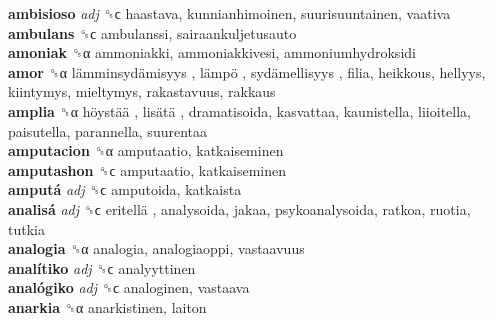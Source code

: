 \textbf{ambisioso} \emph{adj}  ␝ϲ  haastava, kunnianhimoinen, suurisuuntainen, vaativa  \\
\textbf{ambulans} ␝ϲ  ambulanssi, sairaankuljetusauto  \\
\textbf{amoniak} ␝α  ammoniakki, ammoniakkivesi, ammoniumhydroksidi  \\
\textbf{amor} ␝α   lämminsydämisyys ,  lämpö ,  sydämellisyys , filia, heikkous, hellyys, kiintymys, mieltymys, rakastavuus, rakkaus  \\
\textbf{amplia} ␝α   höystää ,  lisätä , dramatisoida, kasvattaa, kaunistella, liioitella, paisutella, parannella, suurentaa  \\
\textbf{amputacion} ␝α  amputaatio, katkaiseminen  \\
\textbf{amputashon} ␝ϲ  amputaatio, katkaiseminen  \\
\textbf{amputá} \emph{adj}  ␝ϲ  amputoida, katkaista  \\
\textbf{analisá} \emph{adj}  ␝ϲ   eritellä , analysoida, jakaa, psykoanalysoida, ratkoa, ruotia, tutkia  \\
\textbf{analogia} ␝α  analogia, analogiaoppi, vastaavuus  \\
\textbf{analítiko} \emph{adj}  ␝ϲ  analyyttinen  \\
\textbf{analógiko} \emph{adj}  ␝ϲ  analoginen, vastaava  \\
\textbf{anarkia} ␝α  anarkistinen, laiton  \\
